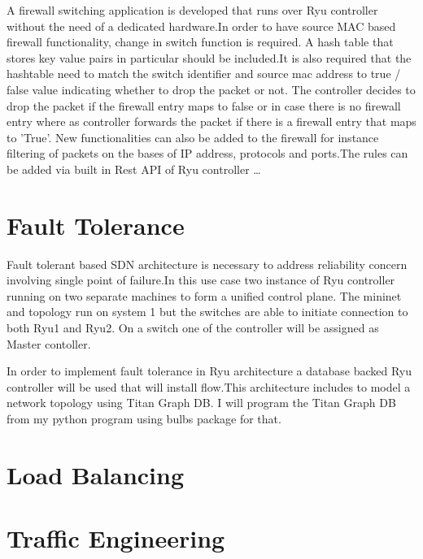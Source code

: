 A firewall switching application is developed that runs over Ryu controller without the need of a dedicated hardware.In order to have source MAC based firewall functionality, change in switch function is required. A hash table that stores key value pairs in particular should be included.It is also required that the hashtable need to match the switch identifier and source mac address to true / false value indicating whether to drop the packet or not. The controller decides to drop the packet if the firewall entry maps to false or in case there is no firewall entry where as controller forwards the packet if there is a firewall entry that maps to 'True'. 
New functionalities can also be added to the firewall for instance filtering of packets on the bases of IP address, protocols and ports.The rules can be added via built in Rest API of Ryu controller \ldots    

\section{Fault Tolerance}

Fault tolerant based SDN architecture is necessary to address reliability concern involving single point of failure.In this use case two instance of Ryu controller running on two separate machines to form  a unified control plane. The mininet and topology run on system 1 but the switches are able to initiate connection to both Ryu1 and Ryu2. On a switch one of the controller will be assigned as Master contoller.

In order to implement fault tolerance in Ryu architecture a database backed Ryu controller will be used that will install flow.This architecture includes to model a network topology using Titan Graph DB. I will program the Titan Graph DB from my python program using bulbs package for that.


\section{Load Balancing}



\section{Traffic Engineering}

